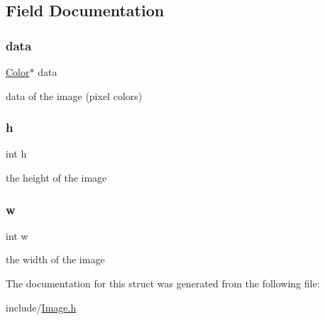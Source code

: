 \subsection{Field Documentation}
\mbox{\label{struct_image_a17c37489ef67e6333577cec67951bc7e}} 
\subsubsection{\texorpdfstring{data}{data}}
{\footnotesize\ttfamily \hyperlink{struct_color}{Color}$\ast$ data}

data of the image (pixel colors) \mbox{\label{struct_image_a16611451551e3d15916bae723c3f59f7}} 
\subsubsection{\texorpdfstring{h}{h}}
{\footnotesize\ttfamily int h}

the height of the image \mbox{\label{struct_image_aac374e320caaadeca4874add33b62af2}} 
\subsubsection{\texorpdfstring{w}{w}}
{\footnotesize\ttfamily int w}

the width of the image 

The documentation for this struct was generated from the following file\+:\begin{DoxyCompactItemize}
\item 
include/\hyperlink{_image_8h}{Image.\+h}\end{DoxyCompactItemize}
